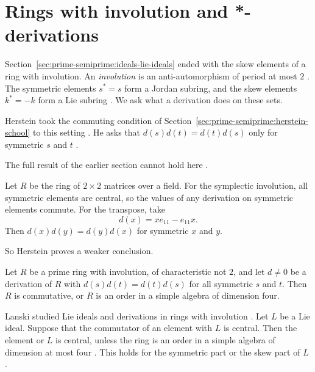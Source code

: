 \section{Rings with involution and *-derivations}\label{sec:prime-semiprime:involution}

Section~\ref{sec:prime-semiprime:ideals-lie-ideals} ended with the skew elements
of a ring with involution. An \emph{involution} is an anti-automorphism of period
at most $2$ \cite[p.~14]{MartindaleMiers1986}. The symmetric elements $s^*=s$ form
a Jordan subring, and the skew elements $k^*=-k$ form a Lie subring
\cite[p.~14]{MartindaleMiers1986}. We ask what a derivation does on these sets.

Herstein took the commuting condition of
Section~\ref{sec:prime-semiprime:herstein-school} to this setting
\cite[p.~356]{Herstein1982}. He asks that $d(s)d(t)=d(t)d(s)$ only for symmetric
$s$ and $t$ \cite[p.~356]{Herstein1982}.

The full result of the earlier section cannot hold here \cite[p.~356]{Herstein1982}.

\begin{example}\label{ex:prime:herstein-symplectic}
Let $R$ be the ring of $2\times 2$ matrices over a field. For the symplectic
involution, all symmetric elements are central, so the values of any derivation
on symmetric elements commute. For the transpose, take
\[
d(x)=xe_{11}-e_{11}x .
\]
Then $d(x)d(y)=d(y)d(x)$ for symmetric $x$ and $y$.
\end{example}

So Herstein proves a weaker
conclusion.

\begin{theorem}\label{thm:prime:herstein-involution}
Let $R$ be a prime ring with involution, of characteristic not $2$, and let
$d\neq 0$ be a derivation of $R$ with $d(s)d(t)=d(t)d(s)$ for all symmetric $s$
and $t$. Then $R$ is commutative, or $R$ is an order in a simple algebra of
dimension four.
\end{theorem}

Lanski studied Lie ideals and derivations in rings with involution
\cite[p.~449]{Lanski1977}.
Let $L$ be a Lie ideal. Suppose that the commutator of an element with $L$ is
central. Then the element or $L$ is central, unless the ring is an order in a
simple algebra of dimension at most four \cite[p.~449]{Lanski1977}. This holds for
the symmetric part or the skew part of $L$ \cite[p.~449]{Lanski1977}.

